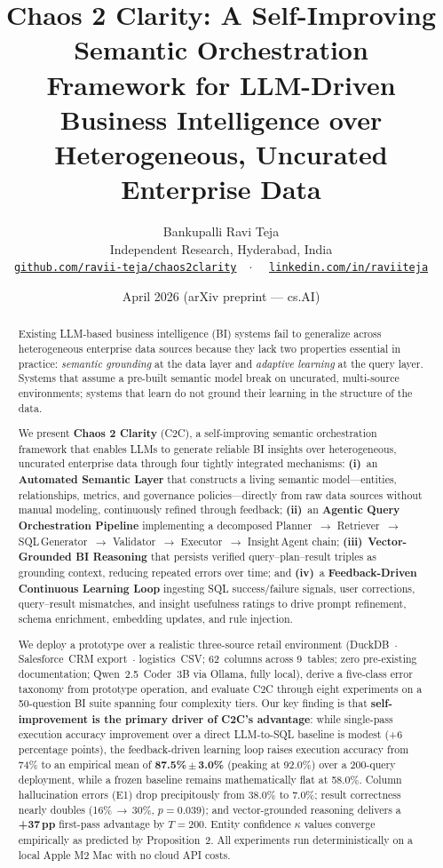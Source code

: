 \documentclass[11pt,a4paper]{article}
\title{\textbf{Chaos 2 Clarity: A Self-Improving Semantic Orchestration\\
Framework for LLM-Driven Business Intelligence over\\
Heterogeneous, Uncurated Enterprise Data}}
\author{
  Bankupalli Ravi Teja\\
  Independent Research, Hyderabad, India\\
  \href{https://github.com/ravii-teja/chaos2clarity}{\texttt{github.com/ravii-teja/chaos2clarity}}~~$\cdot$~~
  \href{https://www.linkedin.com/in/raviiteja/}{\texttt{linkedin.com/in/raviiteja}}
}
\date{April 2026 \quad (arXiv preprint --- cs.AI)}
\begin{document}
\maketitle

\begin{abstract}
Existing LLM-based business intelligence (BI) systems fail to generalize across
heterogeneous enterprise data sources because they lack two properties essential in
practice: \emph{semantic grounding} at the data layer and \emph{adaptive learning}
at the query layer.  Systems that assume a pre-built semantic model break on
uncurated, multi-source environments; systems that learn do not ground their
learning in the structure of the data.

We present \textbf{Chaos 2 Clarity} (C2C), a self-improving semantic orchestration
framework that enables LLMs to generate reliable BI insights over heterogeneous,
uncurated enterprise data through four tightly integrated mechanisms:
\textbf{(i)}~an \textbf{Automated Semantic Layer} that constructs a living semantic
model---entities, relationships, metrics, and governance policies---directly from
raw data sources without manual modeling, continuously refined through feedback;
\textbf{(ii)}~an \textbf{Agentic Query Orchestration Pipeline} implementing a
decomposed Planner~$\to$ Retriever~$\to$ SQL\,Generator~$\to$ Validator~$\to$
Executor~$\to$ Insight\,Agent chain; \textbf{(iii)}~\textbf{Vector-Grounded BI
Reasoning} that persists verified query--plan--result triples as grounding context,
reducing repeated errors over time; and \textbf{(iv)}~a \textbf{Feedback-Driven
Continuous Learning Loop} ingesting SQL success/failure signals, user corrections,
query--result mismatches, and insight usefulness ratings to drive prompt
refinement, schema enrichment, embedding updates, and rule injection.

We deploy a prototype over a realistic three-source retail environment
(DuckDB~$\cdot$ Salesforce~CRM export~$\cdot$ logistics~CSV; 62~columns across
9~tables; zero pre-existing documentation; Qwen~2.5~Coder~3B via Ollama, fully
local), derive a five-class error taxonomy from prototype operation, and evaluate
C2C through eight experiments on a 50-question BI suite spanning four complexity
tiers.  Our key finding is that \textbf{self-improvement is the primary driver of
C2C's advantage}: while single-pass execution accuracy improvement over a direct
LLM-to-SQL baseline is modest (+6 percentage points), the feedback-driven learning
loop raises execution accuracy from 74\% to an empirical mean of \textbf{87.5\%\,$\pm$\,3.0\%}
(peaking at 92.0\%) over a 200-query deployment, while a frozen baseline remains
mathematically flat at 58.0\%.  Column hallucination errors (E1) drop precipitously
from 38.0\% to 7.0\%; result correctness nearly doubles (16\%\,$\to$\,30\%,
$p{=}0.039$); and vector-grounded reasoning delivers a \textbf{+37\,pp} first-pass
advantage by $T{=}200$.  Entity confidence $\kappa$ values converge empirically as
predicted by Proposition~2.  All experiments run deterministically on a local Apple
M2 Mac with no cloud API costs.
\end{abstract}
\end{document}
